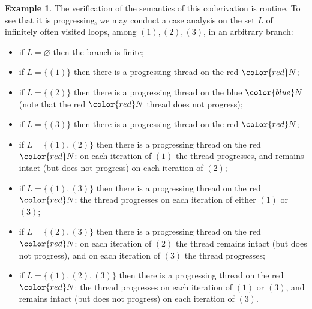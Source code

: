 \documentclass[manuscript,screen]{acmart}
\renewcommand{\emptyset}{\varnothing}
\newcommand{\red}[1]{{\color{red}#1}}
\newcommand{\blue}[1]{{\color{blue}#1}}
\theoremstyle{definition}
\newtheorem{exmp}[thm]{Example}
\theoremstyle{remark}
\newcommand{\n}{N}
\begin{document}
\begin{exmp}
The verification of the semantics of this coderivation is routine. 
To see that it is progressing, we may conduct a case analysis on the set $L$ of infinitely often visited loops, among $(1),(2),(3)$, in an arbitrary branch:
\begin{itemize}
    \item if $L = \emptyset$ then the branch is finite;
    \item if $L=\{(1)\}$ then there is a progressing thread on the red $\red\n$;
    \item if $L=\{(2)\}$ then there is a progressing thread on the blue $\blue \n$ (note that the red $\red \n $ thread does not progress);
    \item if $L=\{(3)\}$ then there is a progressing thread on the red $\red \n$;
    \item if $L=\{(1),(2)\}$ then there is a progressing thread on the red $\red\n$: on each iteration of $(1)$ the thread progresses, and remains intact (but does not progress) on each iteration of $(2)$;
    \item if $L=\{(1),(3)\}$ then there is a progressing thread on the red $\red \n$: the thread progresses on each iteration of either $(1)$ or $(3)$;
    \item if $L=\{(2),(3)\}$ then there is a progressing thread on the red $\red\n$: on each iteration of $(2)$ the thread remains intact (but does not progress), and on each iteration of $(3)$ the thread progresses;
    \item if $L=\{(1),(2),(3)\}$ then there is a progressing thread on the red $\red\n$: the thread progresses on each iteration of $(1)$ or $(3)$, and remains intact (but does not progress) on each iteration of $(3)$.
\end{itemize}
\end{exmp}







\end{document}
